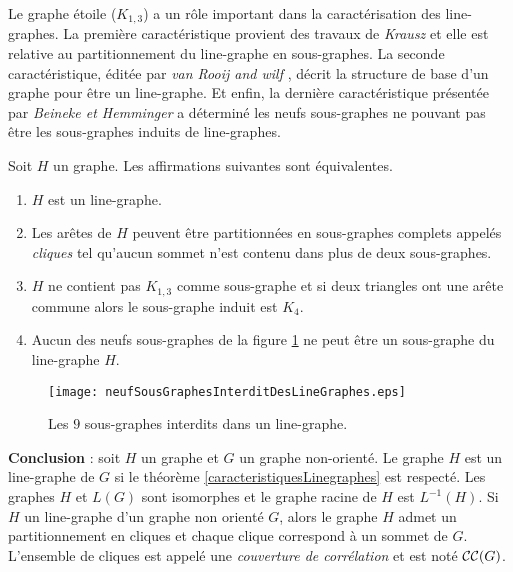 Le graphe \'etoile ($K_{1,3}$) a un r\^ole important dans la caract\'erisation des line-graphes.
La premi\`ere caract\'eristique provient des travaux de {\em Krausz} \cite{krausz1943demonstration} et elle est relative au partitionnement du line-graphe en sous-graphes. 
La seconde caract\'eristique, \'edit\'ee par {\em van Rooij and wilf} \cite{ROOIJetWILF1965interchange}, d\'ecrit la structure de base d'un graphe pour \^etre un line-graphe. 
Et enfin, la derni\`ere caract\'eristique pr\'esent\'ee par {\em Beineke\cite{beineke1968derived} et Hemminger} a d\'etermin\'e les neufs sous-graphes ne pouvant pas \^etre les sous-graphes induits  de line-graphes. 
\begin{theorem}\cite{lineGraphe}
\label{caracteristiquesLinegraphes}
Soit $H$ un graphe. Les affirmations suivantes sont \'equivalentes.
\begin{enumerate}[label = (\alph*)]
	\item $H$ est un line-graphe.
	\item Les ar\^etes de $H$ peuvent \^etre partitionn\'ees en sous-graphes complets appel\'es {\em cliques} tel qu'aucun sommet n'est contenu dans plus de deux sous-graphes. 
	\item $H$ ne contient pas $K_{1,3}$ comme sous-graphe et si deux triangles ont une ar\^ete commune alors le sous-graphe induit est $K_4$.
	\item Aucun des neufs sous-graphes de la figure \ref{neufSousGraphesInterditDesLineGraphes} ne peut \^etre un sous-graphe du line-graphe $H$.
\end{enumerate}
\end{theorem}

\begin{figure}[htb!]\vspace{-0.5em}
	\centering
	\texttt{[image: neufSousGraphesInterditDesLineGraphes.eps]}\vspace{-0.5em}
	\caption{ Les $9$ sous-graphes interdits dans un line-graphe. }\vspace{-0.5em}
	\label{neufSousGraphesInterditDesLineGraphes}
\end{figure}
\FloatBarrier

{\bf Conclusion} :
soit $H$ un graphe et $G$ un graphe non-orient\'e.
Le graphe $H$ est un line-graphe de $G$ si le th\'eor\`eme \ref{caracteristiquesLinegraphes} est respect\'e.
Les graphes $H$ et $L(G)$ sont isomorphes et le graphe racine de $H$ est $L^{-1}(H)$.
Si $H$ un line-graphe d'un graphe non orient\'e $G$,
alors le graphe $H$ admet un partitionnement en cliques et chaque clique correspond \`a un sommet de $G$. L'ensemble de cliques est appel\'e une {\em couverture de corr\'elation} et est not\'e ${\cal CC}(G)$.